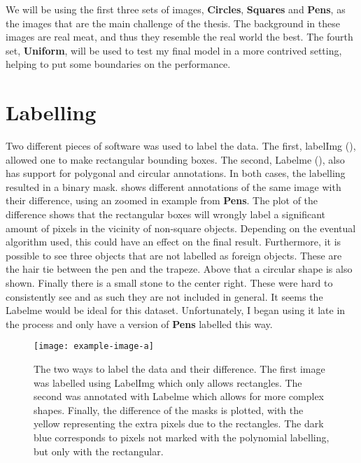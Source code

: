 We will be using the first three sets of images, \textbf{Circles}, \textbf{Squares} and \textbf{Pens}, as the images that are the main challenge of the thesis. The background in these images are real meat, and thus they resemble the real world the best. The fourth set, \textbf{Uniform}, will be used to test my final model in a more contrived setting, helping to put some boundaries on the performance.

\clearpage
\section{Labelling}
\label{sec:labelling}

Two different pieces of software was used to label the data. The first, labelImg (\cite{darrenlTzutalinLabelImg2020}), allowed one to make rectangular bounding boxes. The second, Labelme (\cite{wadaWkentaroLabelme2020}), also has support for polygonal and circular annotations.
In both cases, the labelling resulted in a binary mask.
 shows different annotations of the same image with their difference, using an zoomed in example from \textbf{Pens}. 
The plot of the difference shows that the rectangular boxes will wrongly label a significant amount of pixels in the vicinity of non-square objects. Depending on the eventual algorithm used, this could have an effect on the final result.
Furthermore, it is possible to see three objects that are not labelled as foreign objects. These are the hair tie between the pen and the trapeze. Above that a circular shape is also shown. Finally there is a small stone to the center right. These were hard to consistently see and as such they are not included in general.
It seems the Labelme would be ideal for this dataset. Unfortunately, I began using it late in the process and only have a version of \textbf{Pens} labelled this way. 

\begin{figure}[h]
	\begin{whole}
		\texttt{[image: example-image-a]}
		\caption{The two ways to label the data and their difference. The first image was labelled using LabelImg which only allows rectangles. The second was annotated with Labelme which allows for more complex shapes. Finally, the difference of the masks is plotted, with the yellow representing the extra pixels due to the rectangles. The dark blue corresponds to pixels not marked with the polynomial labelling, but only with the rectangular.}
		\label{fig:labelling}
	\end{whole}
\end{figure}

